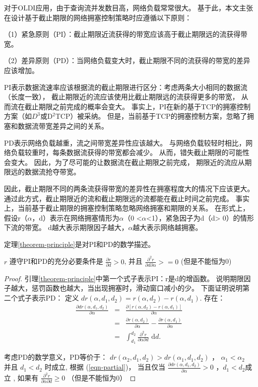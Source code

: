 对于OLDI应用，由于查询流并发数目高，网络负载常常很大。
基于此，本文主张在设计基于截止期限的网络拥塞控制策略时应遵循以下原则：

（1）紧急原则（PI）：截止期限近流获得的带宽应该高于截止期限远的流获得带宽。

（2）差异原则（PD）：当网络负载变大时，截止期限不同的流获得的带宽的差异应该增加。 


PI表示数据流速率应该根据流的截止期限进行区分：考虑两条大小相同的数据流（长度一致），
截止期限近的流应该使用比截止期限远的流获得更多的带宽，
从而流在截止期限之前完成的概率会变大。
事实上，PI在新的基于TCP的拥塞控制方案（如$D^3$或D$^2$TCP）被采纳。
但是，当前基于TCP的拥塞控制方案，忽略了拥塞和数据流带宽差异之间的关系。



PD表示网络负载越重，流之间带宽差异性应该越大。
与网络负载较轻时相比，网络负载较重时，每条数据流获得的带宽都会减少。
从而，错失截止期限的可能性会变大。 
因此，为了尽可能的让数据流在截止期限之前完成，
期限近的流应从期限远的数据流抢夺带宽。
 
因此，截止期限不同的两条流获得带宽的差异性在拥塞程度大的情况下应该更大。
通过此方式，截止期限近的流和截止期限远的流都能在截止时间之前完成。
事实上，当前基于截止期限的拥塞控制策略忽略网络拥塞和期限的关系。
在形式上，假设r（$\alpha$，d）表示在网络拥塞情形为$\alpha$（0 <$\alpha$<1），紧急因子为d（d> 0）的情形下流的带宽。
d越大表示期限因子越大，$\alpha$越大表示网络越拥塞。

定理\ref{theorem-principle}是对PI和PD的数学描述。

\begin{lemma}\label{theorem-principle}
 $r$ 遵守PI和PD的充分必要条件是 $\frac{\partial{r}}{\partial{d}}>0$, 
并且 $\frac{\partial^{2}{r}}{\partial{d}\partial{\alpha}}>=0$ 
(但是不能恒为0)

\end{lemma}


\begin{proof}
引理\ref{theorem-principle}中第一个式子表示PI：r是d的增函数。
说明期限因子越大，惩罚函数也越大，当出现拥塞时，滑动窗口减小的少。
下面证明说明第二个式子表示PD：
定义 $dr(\alpha, d_{1}, d_{2})=r(\alpha, d_{2})-r(\alpha, d_{1})$.
存在：
\begin{eqnarray}\label{eqn-partial}
\frac{\partial{dr(\alpha, d_{1}, d_{2})}}{\partial{\alpha}}
&=&\frac{\partial \left[r(\alpha, d_{2})-r(\alpha, d_{1}) \right]}{\partial{\alpha}} \nonumber \\
&=&\frac{\partial{r(\alpha, d_{2})}}{\partial{\alpha}} - 
\frac{\partial{r(\alpha, d_{1})}}{\partial{\alpha}}
\nonumber \\
&=& \int_{d_{1}}^{d_{2}}\!\!\frac{\partial^{2}{r}}{\partial{\alpha}\partial{d}} \,\,\mathrm{d}d.
\end{eqnarray}

考虑PD的数学意义，PD等价于： 
$dr(\alpha_{2}, d_{1}, d_{2})>dr(\alpha_{1}, d_{1}, d_{2})$
， $\alpha_{1}<\alpha_{2}$ 并且 $d_{1}<d_{2}$ 时成立, 
根据 (\ref{eqn-partial})，
当且仅当
$\frac{\partial{dr(\alpha, d_{1}, d_{2})}}{\partial{\alpha}}>0$
，$d_{1} < d_{2}$成立
, 如果有
$\frac{\partial^{2}{r}}{\partial{\alpha}\partial{d}} \ge 0$ （但是不能恒为0）
\end{proof}


